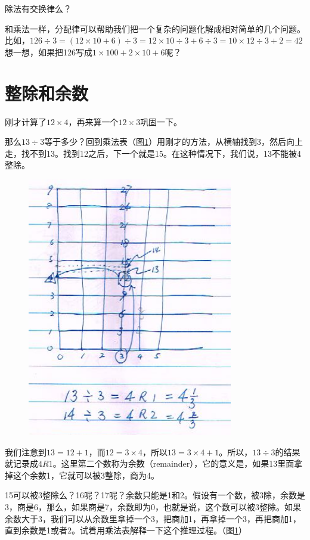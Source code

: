 除法有交换律么？

和乘法一样，分配律可以帮助我们把一个复杂的问题化解成相对简单的几个问题。 比如，$126\div3 = (12\times10+6)\div3 = 12\times10\div3 + 6\div3 = 10\times12\div3 + 2 = 42$ 想一想，如果把126写成$1\times100+2\times10+6$呢？

\section{整除和余数}

刚才计算了$12\times4$，再来算一个$12\times3$巩固一下。

那么$13\div3$等于多少？回到乘法表（图\ref{img_remainder}）用刚才的方法，从横轴找到3，然后向上走，找不到13。找到12之后，下一个就是15。在这种情况下，我们说，13不能被4整除。

\begin{figure}[h]
     \center
     \includegraphics[width=0.8\textwidth]{division_res/remainder}
     \caption{}
     \label{img_remainder}
\end{figure}

我们注意到$13 = 12 + 1$，而$12=3\times4$，所以$13 = 3\times4 + 1$。所以，$13\div3$的结果就记录成$4R1$。这里第二个数称为余数（remainder），它的意义是，如果13里面拿掉这个余数1，它就可以被3整除，商为4。

15可以被3整除么？16呢？17呢？余数只能是1和2。假设有一个数，被3除，余数是3，商是6，那么，如果商是7，余数即为0，也就是说，这个数可以被3整除。如果余数大于3，我们可以从余数里拿掉一个3，把商加1，再拿掉一个3，再把商加1，直到余数是1或者2。试着用乘法表解释一下这个推理过程。（图\ref{img_remainder}）

